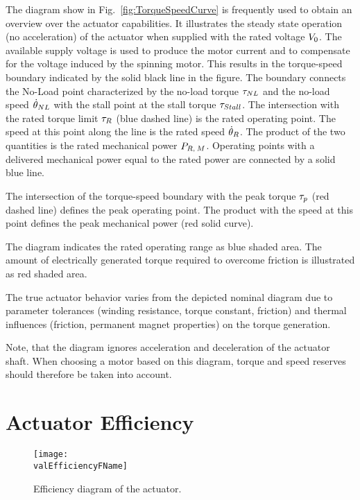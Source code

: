 \documentclass[a4paper,10pt]{cjtdsheet}      %
\begin{document}
\begin{multicols}{2}
The diagram show in Fig.~\ref{fig:TorqueSpeedCurve} is frequently used to obtain an overview over the actuator capabilities. It illustrates the steady state operation (no acceleration) of the actuator when supplied with the rated voltage $V_0$. The available supply voltage is used to produce the motor current and to compensate for the voltage induced by the spinning motor. This results in the torque-speed boundary indicated by the solid black line in the figure. The boundary connects the No-Load point characterized by the no-load torque $\tau_{NL}$ and the no-load speed $\dot{\theta}_{NL}$ with the stall point at the stall torque $\tau_{Stall}$.  The intersection with the rated torque limit $\tau_R$ (blue dashed line) is the rated operating point. The speed at this point along the line is the rated speed $\dot{\theta}_R$. The product of the two quantities is the rated mechanical power $P_{R,\:M}$. Operating points with a delivered mechanical power equal to the rated power are connected by a solid blue line. 

The intersection of the torque-speed boundary with the peak torque $\tau_p$ (red dashed line) defines the peak operating point. The product with the speed at this point defines the peak mechanical power (red solid curve).

The diagram indicates the rated operating range as blue shaded area. The amount of electrically generated torque required to overcome friction is illustrated as red shaded area.

The true actuator behavior varies from the depicted nominal diagram due to parameter tolerances (winding resistance, torque constant, friction) and thermal influences (friction, permanent magnet properties) on the torque generation. 

Note, that the diagram ignores acceleration and deceleration of the actuator shaft. When choosing a motor based on this diagram, torque and speed reserves should therefore be taken into account.
%
\end{multicols}


\section{Actuator Efficiency}
\begin{figure}%
		\texttt{[image: \\valEfficiencyFName]}
		\caption{Efficiency diagram of the actuator.}
	\label{fig:EfficiencyCurve}
\end{figure}
\end{document}
